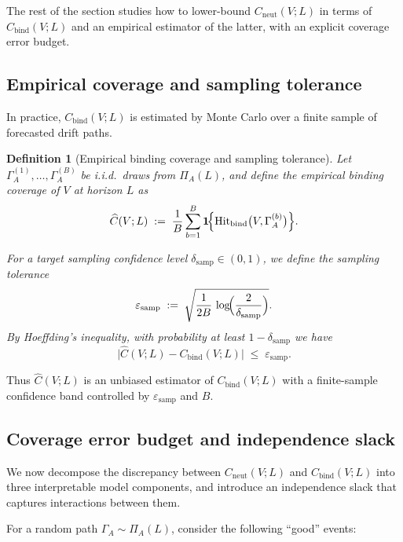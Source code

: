 \documentclass[11pt]{article}
\newcommand{\Hit}{\operatorname{Hit}}
\newtheorem{definition}{Definition}
\begin{document}
The rest of the section studies how to lower-bound $C_{\mathrm{neut}}(V;L)$ in terms of
$C_{\mathrm{bind}}(V;L)$ and an empirical estimator of the latter, with an explicit coverage
error budget.

\subsection{Empirical coverage and sampling tolerance}

In practice, $C_{\mathrm{bind}}(V;L)$ is estimated by Monte Carlo over a finite sample of
forecasted drift paths.

\begin{definition}[Empirical binding coverage and sampling tolerance]
\label{def:empirical-coverage}
Let $\Gamma_A^{(1)},\dots,\Gamma_A^{(B)}$ be i.i.d.\ draws from $\Pi_A(L)$, and define the
empirical binding coverage of $V$ at horizon $L$ as
\[
\widehat{C}(V;L)
\;:=\;
\frac{1}{B} \sum_{b=1}^B
\mathbf{1}\!\Bigl\{
\Hit_{\mathrm{bind}}\bigl(V,\Gamma_A^{(b)}\bigr)
\Bigr\}.
\]

For a target sampling confidence level $\delta_{\mathrm{samp}} \in (0,1)$, we define the
\emph{sampling tolerance}
\begin{equation}
\label{eq:sampling-tolerance}
\varepsilon_{\mathrm{samp}}
\;:=\;
\sqrt{\frac{1}{2B}\,
\log\!\Bigl(\frac{2}{\delta_{\mathrm{samp}}}\Bigr)}.
\end{equation}
By Hoeffding's inequality, with probability at least $1-\delta_{\mathrm{samp}}$ we have
\[
\bigl|\widehat{C}(V;L) - C_{\mathrm{bind}}(V;L)\bigr|
\;\le\;
\varepsilon_{\mathrm{samp}}.
\]
\end{definition}

Thus $\widehat{C}(V;L)$ is an unbiased estimator of $C_{\mathrm{bind}}(V;L)$ with a finite-sample
confidence band controlled by $\varepsilon_{\mathrm{samp}}$ and $B$.

\subsection{Coverage error budget and independence slack}

We now decompose the discrepancy between $C_{\mathrm{neut}}(V;L)$ and $C_{\mathrm{bind}}(V;L)$ into
three interpretable model components, and introduce an independence slack that captures
interactions between them.

For a random path $\Gamma_A \sim \Pi_A(L)$, consider the following ``good'' events:
\end{document}
